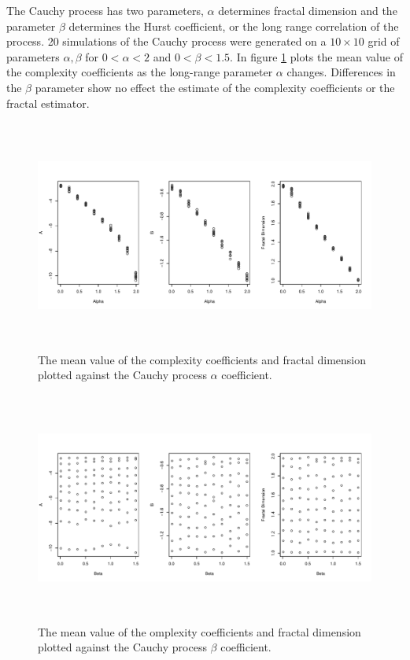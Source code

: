The Cauchy process has two parameters, $\alpha$ determines
fractal dimension and the parameter $\beta$ determines 
the Hurst coefficient, or the long range correlation of the 
process. 20 simulations of the Cauchy process were generated
on a $10 \times 10$ grid of parameters $\alpha, \beta$
for $0 < \alpha < 2$ and $0 < \beta < 1.5$. 
In figure \ref{fig:cauchy-alpha} plots the mean value of the complexity coefficients as the long-range parameter 
$\alpha$ changes. Differences in the $\beta$ parameter show no effect the estimate of the complexity coefficients or the fractal estimator. 

\begin{figure}[!htbp]
  \begin{center}
  \includegraphics[height = 3in, width =6in, keepaspectratio]{./figs/cauchyalpha-scatterplots.pdf}
  \end{center}
  \caption{The mean value of the complexity coefficients and fractal dimension plotted against the Cauchy process $\alpha$ coefficient.}
   \label{fig:cauchy-alpha}
\end{figure}

\begin{figure}[h]
  \begin{center}
  \includegraphics[height = 3in, width =6in, keepaspectratio]{./figs/cauchybeta-scatterplots.pdf}
  \end{center}
  \caption{The mean value of the omplexity coefficients and fractal dimension plotted against the Cauchy process $\beta$ coefficient.}
 \label{fig:cauchy-beta}
\end{figure}

